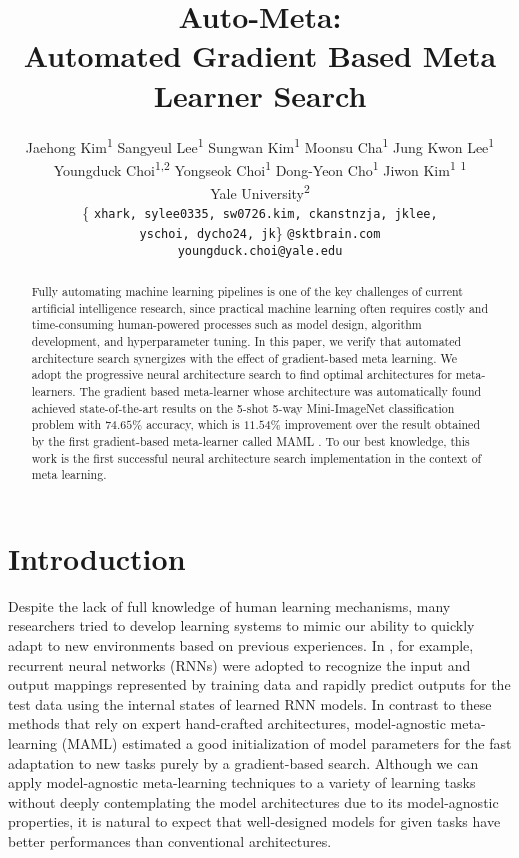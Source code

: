 \documentclass{article}
\title{Auto-Meta: \\
Automated Gradient Based Meta Learner Search}
\author{
  Jaehong Kim\textsuperscript{1}
  \And
  Sangyeul Lee\textsuperscript{1}
  \And
  Sungwan Kim\textsuperscript{1}
  \And
  Moonsu Cha\textsuperscript{1}
  \And
  Jung Kwon Lee\textsuperscript{1}
  \AND
  Youngduck Choi\textsuperscript{1,2}
  \And
  Yongseok Choi\textsuperscript{1}
  \And
  Dong-Yeon Cho\textsuperscript{1}
  \And
  Jiwon Kim\textsuperscript{1} 
  \AND
  \normalfont{SK T-Brain}\textsuperscript{1} \\
  Yale University\textsuperscript{2} \\
  \{ \texttt{xhark, sylee0335, sw0726.kim, ckanstnzja, jklee,} \\ 
  \texttt{yschoi, dycho24, jk}\} \texttt{@sktbrain.com} \\
  \texttt{youngduck.choi@yale.edu}
}
\begin{document}
\maketitle
\begin{abstract}
Fully automating machine learning pipelines is one of the key challenges of current artificial intelligence research, since practical machine learning often requires costly and time-consuming human-powered processes such as model design, algorithm development, and hyperparameter tuning. In this paper, we verify that automated architecture search synergizes with the effect of gradient-based meta learning. We adopt the progressive neural architecture search \cite{liu:pnas_google:DBLP:journals/corr/abs-1712-00559} to find optimal architectures for meta-learners. 
The gradient based meta-learner whose architecture was automatically found achieved state-of-the-art results on the 5-shot 5-way Mini-ImageNet classification problem with $74.65\%$ accuracy, which is $11.54\%$ improvement over the result obtained by the first gradient-based meta-learner called MAML \cite{finn:maml:DBLP:conf/icml/FinnAL17}.
To our best knowledge, this work is the first successful neural architecture search implementation in the context of meta learning.
 \end{abstract}
\section{Introduction}
Despite the lack of full knowledge of human learning mechanisms, many researchers tried to develop learning systems to mimic our ability to quickly adapt to new environments based on previous experiences. In \cite{DBLP:journals/corr/DuanSCBSA16:fast_rl,mishra:attentive_meta:DBLP:journals/corr/MishraRCA17,santoro:memoty_meta:DBLP:conf/icml/SantoroBBWL16,DBLP:journals/corr/WangKTSLMBKB16:learn_to_rl}, for example, recurrent neural networks (RNNs) were adopted to recognize the input and output mappings represented by training data and rapidly predict outputs for the test data using the internal states of learned RNN models. In contrast to these methods that rely on expert hand-crafted architectures, model-agnostic meta-learning (MAML) \cite{finn:maml:DBLP:conf/icml/FinnAL17,nichol:reptile:DBLP:journals/corr/abs-1803-02999} estimated a good initialization of model parameters for the fast adaptation to new tasks purely by a gradient-based search. Although we can apply model-agnostic meta-learning techniques to a variety of learning tasks without deeply contemplating the model architectures due to its model-agnostic properties, it is natural to expect that well-designed models for given tasks have better performances than conventional architectures.
\end{document}
